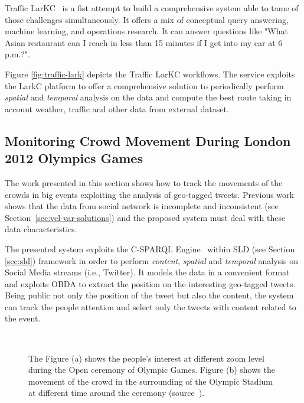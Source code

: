 Traffic LarKC~\cite{DBLP:journals/internet/ValleCDGST11} is a fist attempt to build a comprehensive system able to tame of those challenges simultaneously.
It offers a mix of conceptual query answering, machine learning, and operations research.
It can answer questions like "What Asian restaurant can I reach in less than 15 minutes if I get into my car at 6 p.m.?". 

Figure \ref{fig:traffic-lark} depicts the Traffic LarKC workflows. The service exploits the LarkC platform\cite{DBLP:conf/semco/FenselHABCVFHKLSTWWZ08} to offer a comprehensive solution to periodically perform \textit{spatial} and \textit{temporal} analysis on the data and compute the best route taking in account weather, traffic and other data from external dataset.

\subsection{Monitoring Crowd Movement During London 2012 Olympics Games} \label{sec:uda-london}
The work presented in this section shows how to track the movements of the crowds in big events exploiting the analysis of geo-tagged tweets.
Previous work shows that the data from social network is incomplete and inconsistent (see Section~\ref{sec:vel-var-solutions}) and the proposed system must deal with these data characteristics.

The presented system exploits the C-SPARQL Engine~\cite{DBLP:journals/ijsc/BarbieriBCVG10} within SLD (see Section \ref{sec:sld}) framework in order to perform \textit{content}, \textit{spatial} and \textit{temporal} analysis on Social Media streams (i.e., Twitter). 
It models the data in a convenient format and exploits OBDA to extract the position on the interesting geo-tagged tweets. 
Being public not only the position of the tweet but also the content, the system can track the people attention and select only the tweets with content related to the event. 

\begin{figure}[t]
\centering
{} \\ 
\caption{The Figure (a) shows the people's interest at different zoom level during the Open ceremony of Olympic Games. Figure (b) shows the movement of the crowd in the surrounding of the Olympic Stadium at different time around the ceremony (source~\cite{DBLP:conf/semweb/BalduiniVDTPC13}).}
\label{fig:london-move}
\end{figure}

